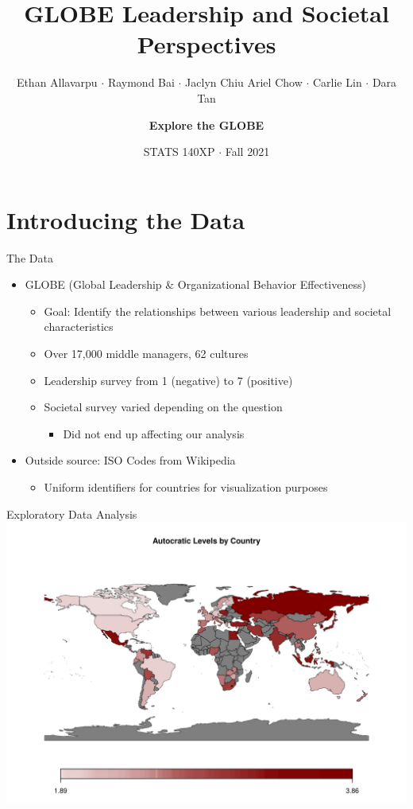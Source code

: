 \documentclass[
  ignorenonframetext,
]{beamer}
\title{GLOBE Leadership and Societal Perspectives}
\subtitle{Ethan Allavarpu \(\cdot\) Raymond Bai \(\cdot\) Jaclyn Chiu
\newline Ariel Chow \(\cdot\) Carlie Lin \(\cdot\) Dara Tan}
\author{\textbf{Explore the GLOBE}}
\date{STATS 140XP \(\cdot\) Fall 2021}
\providecommand{\tightlist}{%
  \setlength{\itemsep}{0pt}\setlength{\parskip}{0pt}}
\begin{document}
\frame{\titlepage}

\hypertarget{introducing-the-data}{%
\section{Introducing the Data}\label{introducing-the-data}}

\begin{frame}{The Data}
\protect\hypertarget{the-data}{}
\begin{itemize}
\tightlist
\item
  GLOBE (Global Leadership \& Organizational Behavior Effectiveness)

  \begin{itemize}
  \tightlist
  \item
    Goal: Identify the relationships between various leadership and
    societal characteristics
  \item
    Over 17,000 middle managers, 62 cultures
  \item
    Leadership survey from 1 (negative) to 7 (positive)
  \item
    Societal survey varied depending on the question

    \begin{itemize}
    \tightlist
    \item
      Did not end up affecting our analysis
    \end{itemize}
  \end{itemize}
\item
  Outside source: ISO Codes from Wikipedia

  \begin{itemize}
  \tightlist
  \item
    Uniform identifiers for countries for visualization purposes
  \end{itemize}
\end{itemize}
\end{frame}

\begin{frame}{Exploratory Data Analysis}
\protect\hypertarget{exploratory-data-analysis}{}
\includegraphics{final_slides_files/figure-beamer/eda_leader-1.pdf}
\end{frame}
\end{document}
